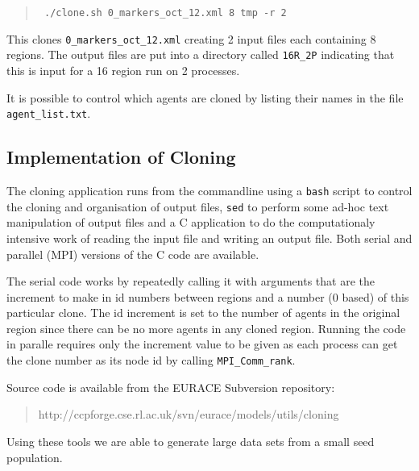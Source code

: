 \begin{quote}
\tt
./clone.sh 0\_markers\_oct\_12.xml 8 tmp -r 2
\end{quote}

This clones \texttt{0\_markers\_oct\_12.xml} creating 2 input files each containing 8 regions. The output files are put into a directory called \texttt{16R\_2P} indicating that this is input for a 16 region run on 2 processes.

It is possible to control which agents are cloned by listing their names in the file \texttt{agent\_list.txt}.

\subsection{Implementation of Cloning}

The cloning application runs from the commandline using a \texttt{bash} script to control the cloning and organisation of output files, \texttt{sed} to perform some ad-hoc text manipulation of output files and a C application to do the computationaly intensive work of reading the input file and writing an output file. Both serial and parallel (MPI) versions of the C code are available.

The serial code works by repeatedly calling it with arguments that are the increment to make in id numbers between regions and a number (0 based) of this particular clone. The id increment is set to the number of agents in the original region since there can be no more agents in any cloned region. Running the code in paralle requires only the increment value to be given as each process can get the clone number as its node id by calling \texttt{MPI\_Comm\_rank}.

Source code is available from the EURACE Subversion repository:
\begin{quote}
http://ccpforge.cse.rl.ac.uk/svn/eurace/models/utils/cloning
\end{quote}
Using these tools we are able to generate large data sets from a small seed population.